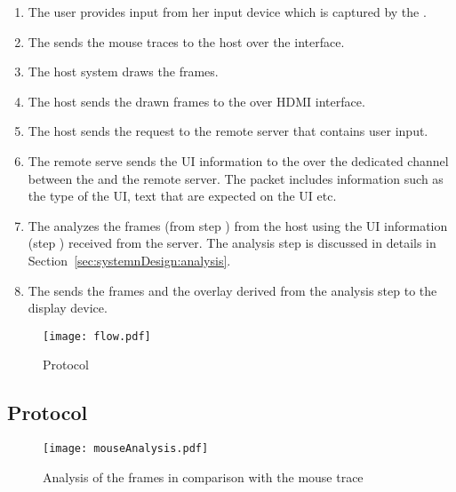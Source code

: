 \begin{enumerate}
  \item[\one] The user provides input from her input device which is captured by the \device.
  \item[\two] The \device sends the mouse traces to the host over the \bluetooth interface.
  \item[\three] The host system draws the frames.
  \item[\four] The host sends the drawn frames to the \device over HDMI interface.
  \item[\five] The host sends the \http request to the remote server that contains user input. 
  \item[\six] The remote serve sends the UI information to the \device over the dedicated \tls channel between the \device and the remote server. The packet includes information such as the type of the UI, text that are expected on the UI etc.
  \item[\seven] The \device analyzes the frames (from step \four) from the host using the UI information (step \six) received from the server. The analysis step is discussed in details in Section~\ref{sec:systemnDesign:analysis}.
  \item[\eight] The \device sends the frames and the overlay derived from the analysis step to the display device.

\end{enumerate}



\begin{figure}
\centering
\texttt{[image: flow.pdf]}
\caption{Protocol}
\label{fig:protocol}
\centering
\end{figure}


\subsection{Protocol}



\begin{figure}
\centering
\texttt{[image: mouseAnalysis.pdf]}
\caption{Analysis of the frames in comparison with the mouse trace}
\label{fig:mouseAnalysis}
\centering
\end{figure}


